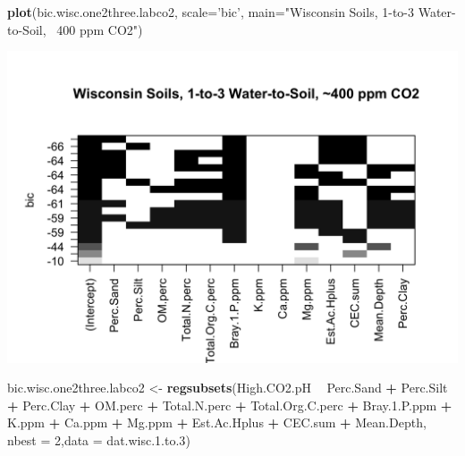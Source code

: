 \documentclass[]{article}
\newenvironment{Shaded}{\begin{snugshade}}{\end{snugshade}}
\newcommand{\DataTypeTok}[1]{\textcolor[rgb]{0.13,0.29,0.53}{#1}}
\newcommand{\DecValTok}[1]{\textcolor[rgb]{0.00,0.00,0.81}{#1}}
\newcommand{\FloatTok}[1]{\textcolor[rgb]{0.00,0.00,0.81}{#1}}
\newcommand{\KeywordTok}[1]{\textcolor[rgb]{0.13,0.29,0.53}{\textbf{#1}}}
\newcommand{\NormalTok}[1]{#1}
\newcommand{\OperatorTok}[1]{\textcolor[rgb]{0.81,0.36,0.00}{\textbf{#1}}}
\newcommand{\StringTok}[1]{\textcolor[rgb]{0.31,0.60,0.02}{#1}}
\begin{document}
\begin{Shaded}
\begin{Highlighting}[]
\KeywordTok{plot}\NormalTok{(bic.wisc.one2three.labco2, }\DataTypeTok{scale=}\StringTok{'bic'}\NormalTok{, }\DataTypeTok{main=}\StringTok{"Wisconsin Soils, 1-to-3 Water-to-Soil, ~400 ppm CO2"}\NormalTok{)}
\end{Highlighting}
\end{Shaded}

\includegraphics{output-rmd/bic.wisc.one2three.labco2-1.png}

\begin{Shaded}
\begin{Highlighting}[]
\NormalTok{bic.wisc.one2three.labco2 <-}\StringTok{ }\KeywordTok{regsubsets}\NormalTok{(High.CO2.pH }\OperatorTok{~}\StringTok{ }\NormalTok{Perc.Sand }\OperatorTok{+}\StringTok{ }\NormalTok{Perc.Silt }\OperatorTok{+}\StringTok{ }\NormalTok{Perc.Clay }\OperatorTok{+}\StringTok{ }\NormalTok{OM.perc }\OperatorTok{+}\StringTok{ }\NormalTok{Total.N.perc }\OperatorTok{+}\StringTok{ }\NormalTok{Total.Org.C.perc }\OperatorTok{+}\StringTok{ }\NormalTok{Bray.}\FloatTok{1.}\NormalTok{P.ppm }\OperatorTok{+}\StringTok{ }\NormalTok{K.ppm }\OperatorTok{+}\StringTok{ }\NormalTok{Ca.ppm }\OperatorTok{+}\StringTok{ }\NormalTok{Mg.ppm }\OperatorTok{+}\StringTok{ }\NormalTok{Est.Ac.Hplus }\OperatorTok{+}\StringTok{ }\NormalTok{CEC.sum }\OperatorTok{+}\StringTok{ }\NormalTok{Mean.Depth, }\DataTypeTok{nbest =} \DecValTok{2}\NormalTok{,}\DataTypeTok{data =}\NormalTok{ dat.wisc.}\FloatTok{1.}\NormalTok{to}\FloatTok{.3}\NormalTok{)}
\end{Highlighting}
\end{Shaded}
\end{document}
